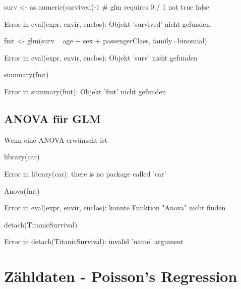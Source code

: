 \documentclass[a4paper,twoside]{tufte-book}\usepackage[]{graphicx}\usepackage[]{color}
\begin{document}
\begin{appendices}
\begin{Schunk}
\begin{Sinput}
surv <- as.numeric(survived)-1 # glm requires 0 / 1 not true false
\end{Sinput}
\begin{Soutput}
Error in eval(expr, envir, enclos): Objekt 'survived' nicht gefunden
\end{Soutput}
\begin{Sinput}
fmt <- glm(surv ~ age  + sex + passengerClass, family=binomial)
\end{Sinput}
\begin{Soutput}
Error in eval(expr, envir, enclos): Objekt 'surv' nicht gefunden
\end{Soutput}
\begin{Sinput}
summary(fmt)
\end{Sinput}
\begin{Soutput}
Error in summary(fmt): Objekt 'fmt' nicht gefunden
\end{Soutput}
\end{Schunk}

\subsection{ANOVA für GLM}

Wenn eine ANOVA erwünscht ist

\begin{Schunk}
\begin{Sinput}
library(car)
\end{Sinput}
\begin{Soutput}
Error in library(car): there is no package called 'car'
\end{Soutput}
\begin{Sinput}
Anova(fmt)
\end{Sinput}
\begin{Soutput}
Error in eval(expr, envir, enclos): konnte Funktion "Anova" nicht finden
\end{Soutput}
\begin{Sinput}
detach(TitanicSurvival)
\end{Sinput}
\begin{Soutput}
Error in detach(TitanicSurvival): invalid 'name' argument
\end{Soutput}
\end{Schunk}

\section{Zähldaten - Poisson's Regression}


\end{appendices}
\end{document}
